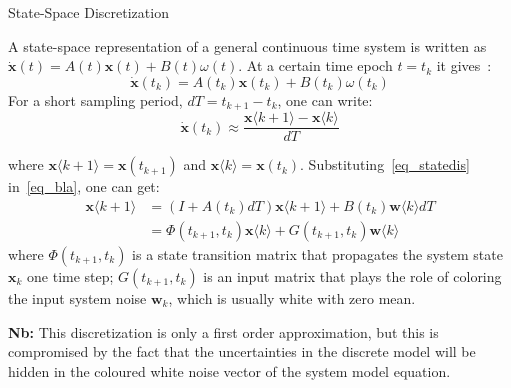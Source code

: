 \documentclass[journal]{IEEEtran}
\begin{document}
\begin{mybox}[label={state_transition}]{State-Space Discretization}
  
A state-space representation of a general continuous time system is written as $\dot{\boldsymbol{x}}(t)=A(t){\boldsymbol{x}}(t)+B(t)\omega(t)$. At a certain time epoch $t=t_k$ it gives~\cite{salychev2012mems}: 
\begin{equation}\label{eq_bla}
\dot{\boldsymbol{x}}(t_k)=A(t_k){\boldsymbol{x}}(t_k)+B(t_k)\omega(t_k)    
\end{equation}
For a short sampling period, $dT=t_{k+1}-t_{k}$, one can write:
\begin{equation}\label{eq_statedis}
   \dot{\boldsymbol{x}}(t_k)\approx\frac{\boldsymbol{x}\langle k+1 \rangle-\boldsymbol{x}\langle k \rangle }{dT}
    \end{equation}
    
  where $\boldsymbol{x}\langle k+1 \rangle={\boldsymbol{x}}(t_{k+1})$ and $\boldsymbol{x}\langle k \rangle={\boldsymbol{x}}(t_{k})$. 
  Substituting~\eqref{eq_statedis} in~\eqref{eq_bla}, one can get:
  \begin{equation}
      \begin{split}
        \boldsymbol{x}\langle k+1 \rangle&= (I+A(t_k)dT) \boldsymbol{x}\langle k+1 \rangle + B(t_k)\boldsymbol{w}\langle k \rangle dT\\
        &= \Phi(t_{k+1},t_{k}) \boldsymbol{x}\langle k \rangle + G(t_{k+1},t_{k})\boldsymbol{w}\langle k \rangle
      \end{split}
  \end{equation}
  where $\Phi(t_{k+1},t_{k})$ is a state transition matrix that propagates the system state $\boldsymbol{x}_{k}$ one time step; $G(t_{k+1},t_{k})$ is an input matrix that plays the role of coloring the input system noise $\boldsymbol{w}_k$, which is usually white with zero mean. \par
  \textbf{Nb:} This discretization is only a first order approximation, but this is compromised by the fact that the uncertainties in the discrete model will be hidden in the coloured white noise vector of the system model equation.

\end{mybox}



%
\end{document}
